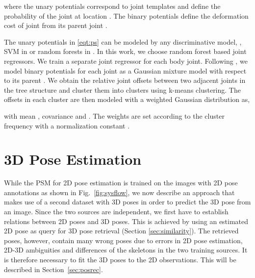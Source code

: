 \documentclass[10pt,twocolumn,letterpaper]{article}
\begin{document}
where the unary potentials  correspond to joint templates and define the probability of the  joint at location . The binary potentials  define the deformation cost of joint  from its parent joint . 

The unary potentials in \eqref{eqt:ps} can be modeled by any discriminative model, \eg, SVM in \cite{YiYang-2011} or random forests in \cite{dantone_tpami2014}. In this work, we choose random forest based joint regressors. We train a separate joint regressor for each body joint. Following \cite{dantone_tpami2014}, we model binary potentials for each joint  as a Gaussian mixture model with respect to its parent . We obtain the relative joint offsets between two adjacent joints in the tree structure and cluster them into  clusters using k-means clustering. The offsets in each cluster are then modeled with a weighted Gaussian distribution as,

with mean , covariance  and  . The weights  are set according to the cluster frequency  with a normalization constant  \cite{dantone_tpami2014}.

\section{3D Pose Estimation}
While the PSM for 2D pose estimation is trained on the images with 2D pose annotations as shown in Fig.~\ref{fig:sysflow}, we now describe an approach that makes use of a second dataset with 3D poses in order to predict the 3D pose from an image. Since the two sources are independent, we first have to establish relations between 2D poses and 3D poses. This is achieved by using an estimated 2D pose as query for 3D pose retrieval (Section \ref{sec:similarity}). The retrieved poses, however, contain many wrong poses due to errors in 2D pose estimation, 2D-3D ambiguities and differences of the skeletons in the two training sources. It is therefore necessary to fit the 3D poses to the 2D observations. This will be described in Section~\ref{sec:posrec}.
\end{document}
